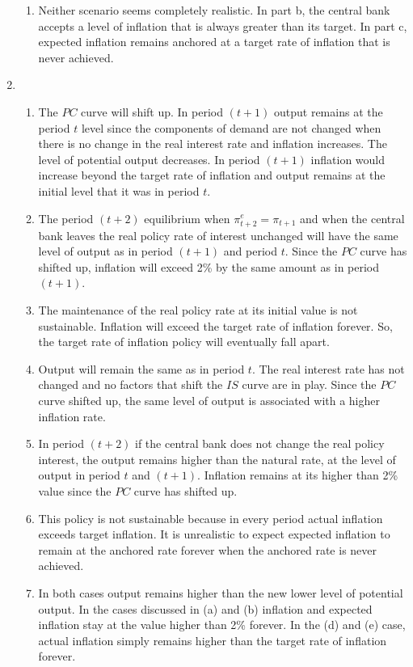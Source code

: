 \documentclass[12pt]{article}
\begin{document}
\begin{enumerate}[label=\arabic*.]
\begin{enumerate}[label=(\alph*)]
        \item Neither scenario seems completely realistic. In part b, the central bank accepts a level of inflation that is always greater than its target. In part c, expected inflation remains anchored at a target rate of inflation that is never achieved.
    \end{enumerate}
    \item \begin{enumerate}[label=(\alph*)]
        \item  The $PC$ curve will shift up. In period $(t+1)$ output remains at the period $t$ level since the components of demand are not changed when there is no change in the real interest rate and inflation increases. The level of potential output decreases. In period $(t+1)$ inflation would increase beyond the target rate of inflation and output remains at the initial level that it was in period $t$.
        \item The period $(t+2)$ equilibrium when $\pi^e_{t+2}=\pi_{t+1}$ and when the central bank leaves the real policy rate of interest unchanged will have the same level of output as in period $(t+1)$ and period $t$. Since the $PC$ curve has shifted up, inflation will exceed 2\% by the same amount as in period $(t+1)$.
        \item The maintenance of the real policy rate at its initial value is not sustainable. Inflation will exceed the target rate of inflation forever. So, the target rate of inflation policy will eventually fall apart.
        \item Output will remain the same as in period $t$. The real interest rate has not changed and no factors that shift the $IS$ curve are in play. Since the $PC$ curve shifted up, the same level of output is associated with a higher inflation rate.
        \item In period $(t+2)$ if the central bank does not change the real policy interest, the output remains higher than the natural rate, at the level of output in period $t$ and $(t+1)$. Inflation remains at its higher than 2\% value since the $PC$ curve has shifted up.
        \item This policy is not sustainable because in every period actual inflation exceeds target inflation. It is unrealistic to expect expected inflation to remain at the anchored rate forever when the anchored rate is never achieved.
        \item In both cases output remains higher than the new lower level of potential output. In the cases discussed in (a) and (b) inflation and expected inflation stay at the value higher than 2\% forever. In the (d) and (e) case, actual inflation simply remains higher than the target rate of inflation forever.

\end{enumerate}
\end{enumerate}
\end{document}
